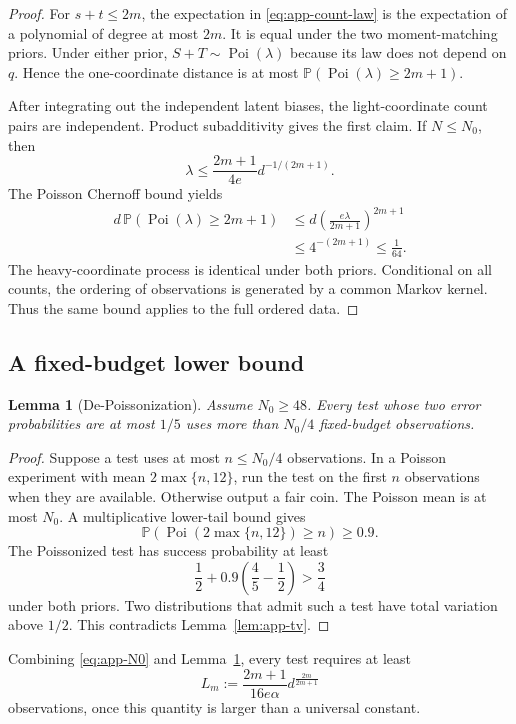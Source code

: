 \documentclass[twoside]{article}
\newtheorem{lemma}[theorem]{Lemma}
\newcommand{\PP}{\mathbb P}
\newcommand{\Poi}{\operatorname{Poi}}
\newcommand{\1}{\mathbf 1}
\begin{document}
\begin{proof}
For $s+t\le2m$, the expectation in \eqref{eq:app-count-law} is the
expectation of a polynomial of degree at most $2m$. It is equal under the two
moment-matching priors. Under either prior, $S+T\sim\Poi(\lambda)$ because its
law does not depend on $q$. Hence the one-coordinate distance is at most
$\PP(\Poi(\lambda)\ge2m+1)$.

After integrating out the independent latent biases, the light-coordinate
count pairs are independent. Product subadditivity gives the first claim. If
$N\le N_0$, then
\[
 \lambda\le\frac{2m+1}{4e}d^{-1/(2m+1)}.
\]
The Poisson Chernoff bound yields
\begin{align*}
 d\,\PP(\Poi(\lambda)\ge2m+1)
 &\le d\left(\frac{e\lambda}{2m+1}\right)^{2m+1}\\
 &\le4^{-(2m+1)}\le\frac1{64}.
\end{align*}
The heavy-coordinate process is identical under both priors. Conditional on
all counts, the ordering of observations is generated by a common Markov
kernel. Thus the same bound applies to the full ordered data.
\end{proof}

\subsection{A fixed-budget lower bound}

\begin{lemma}[De-Poissonization]
\label{lem:depoisson}
Assume $N_0\ge48$. Every test whose two error probabilities are at most $1/5$
uses more than $N_0/4$ fixed-budget observations.
\end{lemma}

\begin{proof}
Suppose a test uses at most $n\le N_0/4$ observations. In a Poisson experiment
with mean $2\max\{n,12\}$, run the test on the first $n$ observations when
they are available. Otherwise output a fair coin. The Poisson mean is at most
$N_0$. A multiplicative lower-tail bound gives
\[
 \PP(\Poi(2\max\{n,12\})\ge n)\ge0.9.
\]
The Poissonized test has success probability at least
\[
 \frac12+0.9\left(\frac45-\frac12\right)>\frac34
\]
under both priors. Two distributions that admit such a test have total
variation above $1/2$. This contradicts Lemma~\ref{lem:app-tv}.
\end{proof}

Combining \eqref{eq:app-N0} and Lemma~\ref{lem:depoisson}, every test requires
at least
\begin{equation}
 L_m:=\frac{2m+1}{16e\alpha}
 d^{\frac{2m}{2m+1}}
 \label{eq:app-Lm}
\end{equation}
observations, once this quantity is larger than a universal constant.
\end{document}
